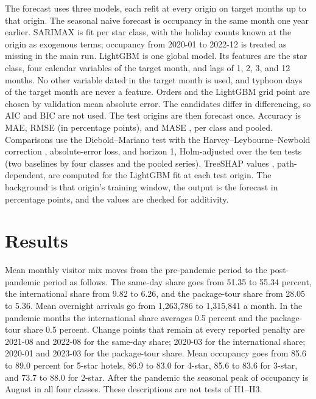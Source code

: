 \documentclass[11pt,a4paper]{article}
\begin{document}
The forecast uses three models, each refit at every origin on target months up to that origin. The seasonal naive forecast is occupancy in the same month one year earlier. SARIMAX is fit per star class, with the holiday counts known at the origin as exogenous terms; occupancy from 2020-01 to 2022-12 is treated as missing in the main run. LightGBM \cite{ke2017} is one global model. Its features are the star class, four calendar variables of the target month, and lags of 1, 2, 3, and 12 months. No other variable dated in the target month is used, and typhoon days of the target month are never a feature. Orders and the LightGBM grid point are chosen by validation mean absolute error. The candidates differ in differencing, so AIC and BIC are not used. The test origins are then forecast once. Accuracy is MAE, RMSE (in percentage points), and MASE \cite{hyndman2006}, per class and pooled. Comparisons use the Diebold--Mariano test \cite{diebold1995} with the Harvey--Leybourne--Newbold correction \cite{harvey1997}, absolute-error loss, and horizon 1, Holm-adjusted \cite{holm1979} over the ten tests (two baselines by four classes and the pooled series). TreeSHAP values \cite{lundberg2017}, path-dependent, are computed for the LightGBM fit at each test origin. The background is that origin's training window, the output is the forecast in percentage points, and the values are checked for additivity.

\section{Results}
Mean monthly visitor mix moves from the pre-pandemic period to the post-pandemic period as follows. The same-day share goes from 51.35 to 55.34 percent, the international share from 9.82 to 6.26, and the package-tour share from 28.05 to 5.36. Mean overnight arrivals go from 1,263,786 to 1,315,841 a month. In the pandemic months the international share averages 0.5 percent and the package-tour share 0.5 percent. Change points that remain at every reported penalty are 2021-08 and 2022-08 for the same-day share; 2020-03 for the international share; 2020-01 and 2023-03 for the package-tour share. Mean occupancy goes from 85.6 to 89.0 percent for 5-star hotels, 86.9 to 83.0 for 4-star, 85.6 to 83.6 for 3-star, and 73.7 to 88.0 for 2-star. After the pandemic the seasonal peak of occupancy is August in all four classes. These descriptions are not tests of H1--H3.
\end{document}
